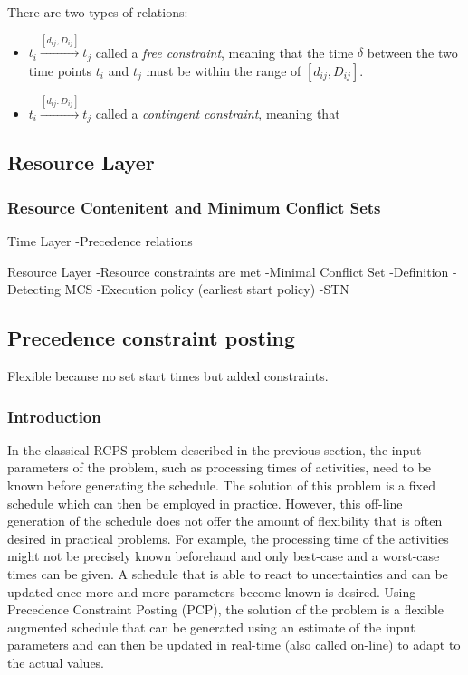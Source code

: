\documentclass{article}
\begin{document}
There are two types of relations:
\begin{itemize}
\item $t_i \xrightarrow{[d_{ij},D_{ij}]} t_j$ called a \emph{free constraint}, meaning that the time $\delta$ between the two time points $t_i$ and $t_j$ must be within the range of $[d_{ij},D_{ij}]$.
\item $t_i \xrightarrow{[d_{ij}:D_{ij}]} t_j$ called a \emph{contingent constraint}, meaning that 
\end{itemize}

\subsection{Resource Layer}
\subsubsection{Resource Contenitent and Minimum Conflict Sets}


Time Layer
-Precedence relations

Resource Layer
-Resource constraints are met
-Minimal Conflict Set
	-Definition
-Detecting MCS
	-Execution policy (earliest start policy)
	-STN
	

\subsection{Precedence constraint posting}
Flexible because no set start times but added constraints.

\subsubsection{Introduction}
In the classical RCPS problem described in the previous section, the input parameters of the problem, such as processing times of activities, need to be known before generating the schedule. The solution of this problem is a fixed schedule which can then be employed in practice. However, this off-line generation of the schedule does not offer the amount of flexibility that is often desired in practical problems. For example, the processing time of the activities might not be precisely known beforehand and only best-case and a worst-case times can be given. A schedule that is able to react to uncertainties and can be updated once more and more parameters become known is desired. Using Precedence Constraint Posting (PCP), the solution of the problem is a flexible augmented schedule that can be generated using an estimate of the input parameters and can then be updated in real-time (also called on-line) to adapt to the actual values.
\end{document}
